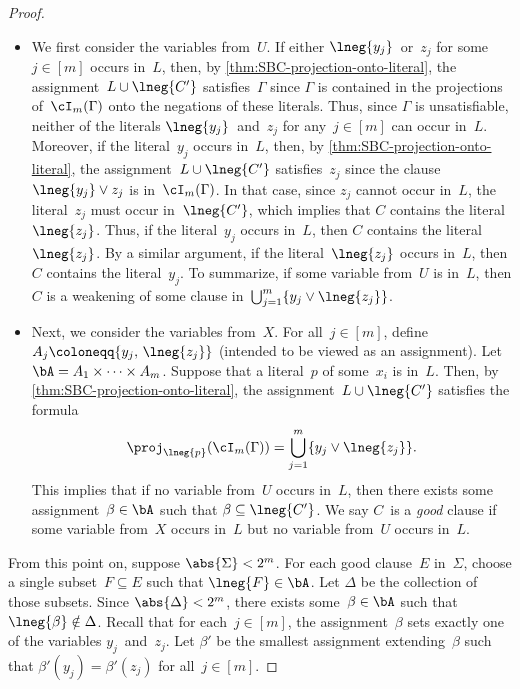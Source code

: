 \documentclass[10pt,a4paper]{article}
\begin{document}
\begin{proof}
  \begin{itemize}
  \item We first consider the variables from~$U$.
    If either $\lneg{y_j}$~or~$z_j$ for some~$j \in [m]$ occurs in~$L$,
    then, by \cref{thm:SBC-projection-onto-literal},
    the assignment~$L \cup \lneg{C'}$ satisfies~$\Gamma$
    since $\Gamma$ is contained in the projections
    of~$\cI_m(\Gamma)$ onto the negations of these literals.
    Thus, since $\Gamma$ is unsatisfiable,
    neither of the literals $\lneg{y_j}$~and~$z_j$
    for any~$j \in [m]$ can occur in~$L$.
    Moreover, if the literal~$y_j$ occurs in~$L$,
    then, by \cref{thm:SBC-projection-onto-literal},
    the assignment~$L \cup \lneg{C'}$ satisfies~$z_j$
    since the clause~$\lneg{y_j} \lor z_j$ is in~$\cI_m(\Gamma)$.
    In that case, since $z_j$ cannot occur in~$L$,
    the literal~$z_j$ must occur in~$\lneg{C'}$,
    which implies that $C$ contains the literal~$\lneg{z_j}$.
    Thus, if the literal~$y_j$ occurs in~$L$,
    then $C$ contains the literal~$\lneg{z_j}$.
    By a similar argument, if the literal~$\lneg{z_j}$ occurs in~$L$,
    then $C$ contains the literal~$y_j$.
    To summarize, if some variable from~$U$ is in~$L$,
    then $C$ is a weakening of some clause
    in~$\bigcup_{j = 1}^m \{y_j \lor \lneg{z_j}\}$.
  \item Next, we consider the variables from~$X$.
    For all~$j \in [m]$, define $A_j \coloneqq \{y_j,\, \lneg{z_j}\}$
    (intended to be viewed as an assignment).
    Let $\bA = A_1 \times \dots \times A_m$.
    Suppose that a literal~$p$ of some~$x_i$ is in~$L$.
    Then, by \cref{thm:SBC-projection-onto-literal},
    the assignment~$L \cup \lneg{C'}$ satisfies the formula
    \begin{equation*}
      \proj_{\lneg{p}}(\cI_m(\Gamma)) = \bigcup_{j = 1}^m \{y_j \lor \lneg{z_j}\}.
    \end{equation*}
    This implies that if no variable from~$U$ occurs in~$L$,
    then there exists some assignment~$\beta \in \bA$
    such that $\beta \subseteq \lneg{C'}$.
    We say $C$~is a \emph{good} clause
    if some variable from~$X$ occurs in~$L$
    but no variable from~$U$ occurs in~$L$.
  \end{itemize}

  From this point on, suppose $\abs{\Sigma} < 2^m$.
  For each good clause~$E$ in~$\Sigma$,
  choose a single subset~$F \subseteq E$ such that $\lneg{F} \in \bA$.
  Let $\Delta$ be the collection of those subsets.
  Since $\abs{\Delta} < 2^m$, there exists some~$\beta \in \bA$
  such that $\lneg{\beta} \notin \Delta$.
  Recall that for each~$j \in [m]$, the assignment~$\beta$
  sets exactly one of the variables $y_j$~and~$z_j$.
  Let $\beta'$ be the smallest assignment extending~$\beta$
  such that $\beta'(y_j) = \beta'(z_j)$ for all~$j \in [m]$.


\end{proof}
\end{document}
